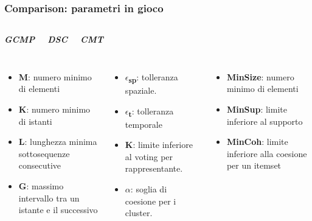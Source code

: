 \documentclass{beamer}
\begin{document}
\begin{frame}
	\frametitle{Comparison: parametri in gioco}
	\begin{columns}
		
		\begin{center}
			\textbf{\textit{\huge{GCMP}}}
			
		\end{center}
		
		\begin{center}
			\textbf{\textit{\huge{DSC}}}
			
		\end{center}
		
		\begin{center}
			\textbf{\textit{\huge{CMT}}}
			
		\end{center}
	\end{columns}
	\begin{columns}
		
		\column{.3\columnwidth}

\begin{itemize}
	\item \textbf{M}: numero minimo di elementi
	\item \textbf{K}: numero minimo di istanti
	\item \textbf{L}: lunghezza minima sottosequenze consecutive
	\item \textbf{G}: massimo intervallo tra un istante e il successivo
\end{itemize}
		
		
		\column{.3\textwidth}
		
			\begin{itemize}
			\item \textbf{$\epsilon$\textsubscript{sp}}: tolleranza spaziale.
			\item \textbf{$\epsilon$\textsubscript{t}}: tolleranza temporale
			\item \textbf{K}: limite inferiore al voting per rappresentante.
			\item \textbf{$\alpha$}: soglia di coesione per i cluster. 
		\end{itemize}
		
		\column{.3\textwidth}
		
	\begin{itemize}
		\item \textbf{MinSize}: numero minimo di elementi
		\item \textbf{MinSup}: limite inferiore al supporto
		\item \textbf{MinCoh}: limite inferiore alla coesione per un itemset
	\end{itemize}
		
	\end{columns}
\end{frame}    
\end{document}
